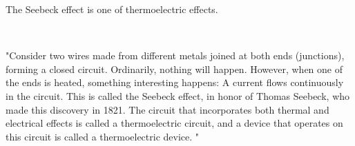 \documentclass[reprint,amsmath,amssymb,aps,]{revtex4-1}
\numberwithin{equation}{section}%
\begin{document}
    The Seebeck effect is one of thermoelectric effects.

    \

    "Consider two wires made from different metals joined at both ends (junctions), forming a closed circuit. Ordinarily, nothing will happen. However, when one of the ends is heated, something interesting happens: A current flows continuously in the circuit. This is  called the Seebeck effect, in honor of Thomas Seebeck, who made this discovery in 1821. The circuit that incorporates both thermal and electrical effects is called a thermoelectric circuit, and a device that operates on this circuit is called a thermoelectric device. \cite{Cengel}"
\end{document}
